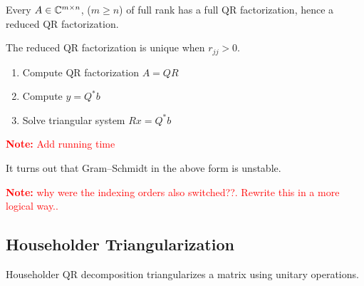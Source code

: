 \documentclass[12pt]{article}
\newcommand{\note}[1]{\textcolor{red}{\textbf{Note:} #1}}
\begin{document}
\begin{theorem}
Every \( A\in\mathbb{C}^{m\times n} \), (\( m\geq n \)) of full rank has a full QR factorization, hence a reduced QR factorization.

The reduced QR factorization is unique when \( r_{jj} > 0 \).
\end{theorem}

\begin{method}
\begin{enumerate}[nolistsep]
    \item Compute QR factorization \( A = QR \)
    \item Compute \( y = Q^*b \)
    \item Solve triangular system \( Rx = Q^*b \)
\end{enumerate}
\end{method}
\note{Add running time}

It turns out that Gram--Schmidt in the above form is unstable.

\begin{algorithm}
\begin{algorithmic}
    \EndFor
\EndFor
\end{algorithmic}
\end{algorithm}

\iffalse
\begin{algorithm}[Modified Gram--Schmidt]
\begin{algorithmic}
\For{\( i=1 \) \To \( n \)}
    \State{ \( v_i = a_i \) }
\EndFor
\For{\( i=1 \) \To \( n \)}
    \State{\( r_{ii} = \norm{v_i}_2 \)}
    \State{\( q_i = v_i / r_{ii} \)}
    \For{\( j=i+1 \) \To \( n \)}
        \State{\( r_{ij} = q_i^* v_j \)}
        \State{\( v_j = v_j - r_{ij}q_i \)}
    \EndFor
    \State{\(q_{i    5} = v_i / r_{ii}\)}
\EndFor
\end{algorithmic}
\end{algorithm}
\fi

\note{why were the indexing orders also switched??. Rewrite this in a more logical way..}

\subsection{Householder Triangularization}
Householder QR decomposition triangularizes a matrix using unitary operations.
\end{document}
